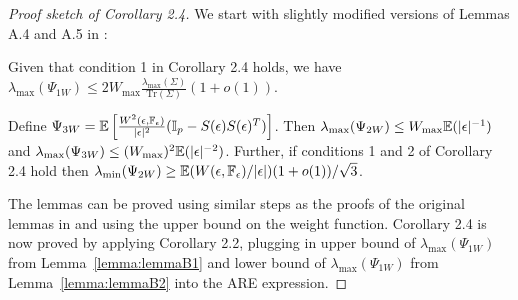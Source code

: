 \begin{proof}[Proof sketch of Corollary 2.4]
%

We start with slightly modified versions of Lemmas A.4 and A.5 in \cite{ref:JASA151658_WangPengLi}:

\begin{Lemma}\label{lemma:lemmaB1}
Given that condition 1 in Corollary 2.4 holds, we have $\lambda_{\max} (\Psi_{1W}) \leq 2 W_{\max} \frac{\lambda_{\max} (\Sigma) }{\text{Tr} (\Sigma)} (1+o(1))$.
\end{Lemma}

\begin{Lemma}\label{lemma:lemmaB2}
Define $\Psi_{3W} = {\mathbb{E}} \left[ \frac{W^2(\epsilon, {\mathbb{F}}_\epsilon)}{| \epsilon |^2} ({\mathbb{I}}_p - S(\epsilon) S(\epsilon)^T )\right] $. Then $\lambda_{\max} (\Psi_{2W}) \leq W_{\max} {\mathbb{E}}(| \epsilon |^{-1})$ and $\lambda_{\max} (\Psi_{3W}) \leq (W_{\max})^2 {\mathbb{E}}( | \epsilon|^{-2})$. Further, if conditions 1 and 2 of Corollary 2.4 hold then $\lambda_{\min} (\Psi_{2W}) \geq {\mathbb{E}}( W(\epsilon, {\mathbb{F}}_\epsilon)/ | \epsilon |)(1+o(1))/\sqrt 3$.
\end{Lemma}
%
The lemmas can be proved using similar steps as the proofs of the original lemmas in \cite{ref:JASA151658_WangPengLi} and using the upper bound on the weight function. Corollary 2.4 is now proved by applying Corollary 2.2, plugging in upper bound of $\lambda_{\max} (\Psi_{1W})$ from Lemma~\ref{lemma:lemmaB1} and lower bound of $\lambda_{\max} (\Psi_{1W})$ from Lemma~\ref{lemma:lemmaB2} into the ARE expression.
\end{proof}

